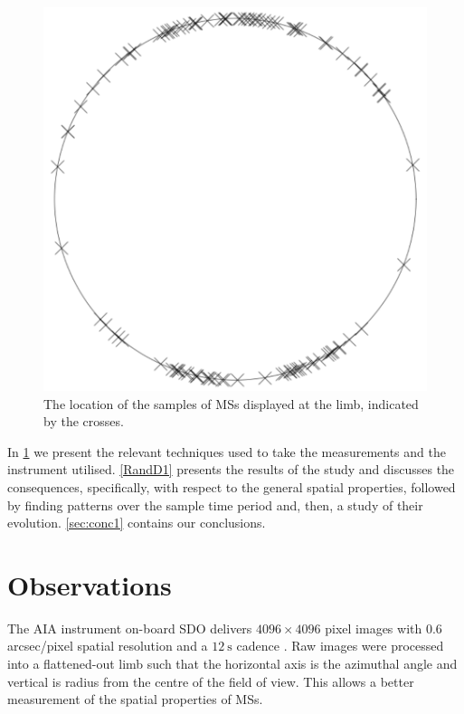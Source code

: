 \begin{figure}[h!]
	\centering
	\includegraphics[scale=0.3]{Chapter3/Figs/polar_demo}
	\caption{\small The location of the samples of MSs displayed at the limb, indicated by the crosses.}
	\label{fig:polar-sample}
\end{figure}


In \cref{sec:obs1} we present the relevant techniques used to take the measurements and the instrument utilised. \cref{RandD1} presents the results of the study and discusses the consequences, specifically, with respect to the general spatial properties, followed by finding patterns over the sample time period and, then, a study of their evolution. \cref{sec:conc1} contains our conclusions.   


\section{Observations}
\label{sec:obs1}   
The AIA instrument on-board SDO delivers $4096 \times 4096$ pixel images with $0.6$ arcsec/pixel spatial resolution and a $12\ \textrm{s}$ cadence \cite{AIAspec}. Raw images were processed into a flattened-out limb such that the horizontal axis is the azimuthal angle and vertical is radius from the centre of the field of view. This allows a better measurement of the spatial properties of MSs.


